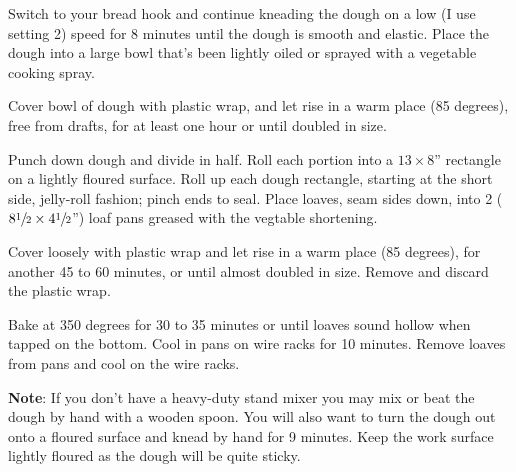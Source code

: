 \documentclass{article}
\begin{document}
Switch to your bread hook and continue kneading the dough on a low (I use setting 2)
speed for 8 minutes until the dough is smooth and elastic. Place the dough into a
large bowl that's been lightly oiled or sprayed with a vegetable cooking spray.

Cover bowl of dough with plastic wrap, and let rise in a warm place (85 degrees), free from
drafts, for at least one hour or until doubled in size.

Punch down dough and divide in half. Roll each portion into a $13\times8$'' rectangle on a
lightly floured surface. Roll up each dough rectangle, starting at the short side,
jelly-roll fashion; pinch ends to seal. Place loaves, seam sides down, into 2
($8\sfrac{1}{2}\times4\sfrac{1}{2}$'') loaf pans greased with the vegtable shortening.

Cover loosely with plastic wrap and let rise in a warm place (85 degrees), for another
45 to 60 minutes, or until almost doubled in size. Remove and discard the plastic wrap.

Bake at 350 degrees for 30 to 35 minutes or until loaves sound hollow when tapped on the bottom.
Cool in pans on wire racks for 10 minutes. Remove loaves from pans and cool on the wire racks.


\textbf{Note}: If you don't have a heavy-duty stand mixer you may mix or beat the dough by
hand with a wooden spoon. You will also want to turn the dough out onto a floured
surface and knead by hand for 9 minutes. Keep the work surface lightly floured as
the dough will be quite sticky.

\end{document}

